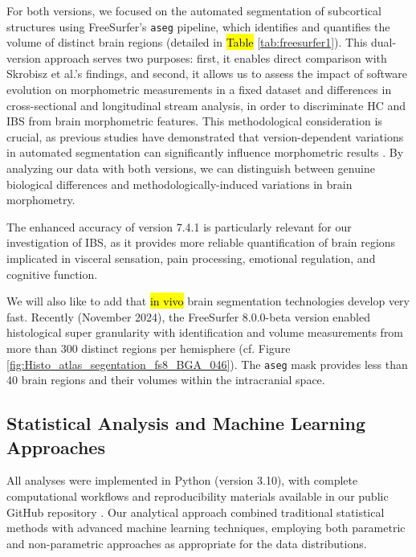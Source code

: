 \documentclass[diagnostics,article,accept,pdftex,moreauthors]{Definitions/mdpi}
\begin{document}
For both versions, we focused on the automated segmentation of subcortical structures using FreeSurfer's \texttt{aseg} pipeline, which identifies and quantifies the volume of distinct brain regions (detailed in \hl{Table} %
\ref{tab:freesurfer1}). This dual-version approach serves two purposes: first, it enables direct comparison with Skrobisz et al.'s \cite{Skrobisz2022} findings, and second, it allows us to assess the impact of software evolution on morphometric measurements in a fixed dataset and differences in cross-sectional and longitudinal stream analysis, in order to discriminate HC and IBS from brain morphometric features. This methodological consideration is crucial, as previous studies have demonstrated that version-dependent variations in automated segmentation can significantly influence morphometric results \cite{Klauschen2009,Jovicich2009,Gronenschild2012,Glatard2015,Knussmann2022,Debiasi2023}. By analyzing our data with both versions, we can distinguish between genuine biological differences and methodologically-induced variations in brain morphometry.

The enhanced accuracy of version 7.4.1 is particularly relevant for our investigation of IBS, as it provides more reliable quantification of brain regions implicated in visceral sensation, pain processing, emotional regulation, and cognitive function. 
 
 
We will also like to add that {\hl{in vivo} %
} brain segmentation technologies develop very fast. Recently (November 2024), the FreeSurfer 8.0.0-beta version enabled histological super granularity with identification and volume measurements from more than 300 distinct regions per hemisphere (cf. Figure \ref{fig:Histo_atlas_segentation_fs8_BGA_046}). The \texttt{aseg} mask provides less than 40 brain regions and their volumes within the intracranial space.




\subsection{Statistical Analysis and Machine Learning Approaches}

All analyses were implemented in Python (version 3.10), with complete computational workflows and reproducibility materials available in our public GitHub repository 
.
Our analytical approach combined traditional statistical methods with advanced machine learning techniques, employing both parametric and non-parametric approaches as appropriate for the data distributions.
\end{document}
